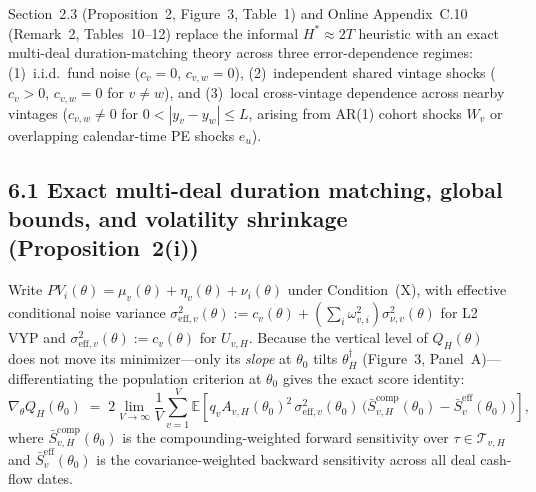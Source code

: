 \documentclass[10.5pt]{article}
\newcommand{\E}{\mathbb{E}}
\newcommand{\T}{\mathcal{T}}
\begin{document}
Section~2.3 (Proposition~2, Figure~3, Table~1) and Online Appendix~C.10 (Remark~2, Tables~10--12) replace the informal $H^\ast \approx 2T$ heuristic with an exact multi-deal duration-matching theory across three error-dependence regimes: (1)~i.i.d.\ fund noise ($c_v=0$, $c_{v,w}=0$), (2)~independent shared vintage shocks ($c_v>0$, $c_{v,w}=0$ for $v\neq w$), and (3)~local cross-vintage dependence across nearby vintages ($c_{v,w}\neq 0$ for $0<|y_v-y_w|\le L$, arising from AR(1) cohort shocks $W_v$ or overlapping calendar-time PE shocks $e_u$).

\subsection*{6.1 Exact multi-deal duration matching, global bounds, and volatility shrinkage (Proposition~2(i))}

Write $PV_i(\theta) = \mu_v(\theta) + \eta_v(\theta) + \nu_i(\theta)$ under Condition~(X), with effective conditional noise variance $\sigma_{\mathrm{eff},v}^2(\theta) := c_v(\theta) + (\sum_i \omega_{v,i}^2)\sigma_{\nu,v}^2(\theta)$ for L2 VYP and $\sigma_{\mathrm{eff},v}^2(\theta) := c_v(\theta)$ for $U_{v,H}$. Because the vertical level of $Q_H(\theta)$ does not move its minimizer---only its \emph{slope} at $\theta_0$ tilts $\theta_H^\dagger$ (Figure~3, Panel~A)---differentiating the population criterion at $\theta_0$ gives the exact score identity:
\[
\nabla_\theta Q_H(\theta_0)
\;=\; 2 \lim_{V\to\infty}\frac{1}{V}\sum_{v=1}^V \E\!\left[q_v A_{v,H}(\theta_0)^2\,\sigma_{\mathrm{eff},v}^2(\theta_0)\,\Big(\bar{S}_{v,H}^{\mathrm{comp}}(\theta_0) - \bar{S}_v^{\mathrm{eff}}(\theta_0)\Big)\right],
\]
where $\bar{S}_{v,H}^{\mathrm{comp}}(\theta_0)$ is the compounding-weighted forward sensitivity over $\tau\in\T_{v,H}$ and $\bar{S}_v^{\mathrm{eff}}(\theta_0)$ is the covariance-weighted backward sensitivity across all deal cash-flow dates.
\end{document}
